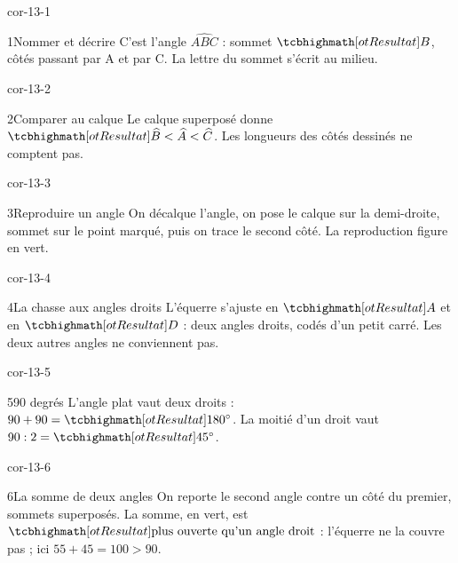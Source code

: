\clearpage\pagestyle{otMain}\setlength{\otBlocEspacement}{2.5mm}\fontsize{11}{15}\selectfont{}
\begin{blocLivre}{cor-13-1}\begin{corrige}{1}{Nommer et décrire}
C’est l’angle $\widehat{ABC}$ : sommet $\res B$, côtés passant par A et par C. La lettre du sommet s’écrit au milieu.
\label{fig-cor-13-1}
\end{corrige}\end{blocLivre}
\begin{blocLivre}{cor-13-2}\begin{corrige}{2}{Comparer au calque}
Le calque superposé donne $\res{\widehat B<\widehat A<\widehat C}$. Les longueurs des côtés dessinés ne comptent pas.
\label{fig-cor-13-2}
\end{corrige}\end{blocLivre}
\begin{blocLivre}{cor-13-3}\begin{corrige}{3}{Reproduire un angle}
On décalque l’angle, on pose le calque sur la demi-droite, sommet sur le point marqué, puis on trace le second côté. La reproduction figure en vert.
\label{fig-cor-13-3}
\end{corrige}\end{blocLivre}
\begin{blocLivre}{cor-13-4}\begin{corrige}{4}{La chasse aux angles droits}
L’équerre s’ajuste en $\res A$ et en $\res D$ : deux angles droits, codés d’un petit carré. Les deux autres angles ne conviennent pas.
\label{fig-cor-13-4}
\end{corrige}\end{blocLivre}
\begin{blocLivre}{cor-13-5}\begin{corrige}{5}{90 degrés}
L’angle plat vaut deux droits : $90+90=\res{180^\circ}$. La moitié d’un droit vaut $90:2=\res{45^\circ}$.
\end{corrige}\end{blocLivre}
\begin{blocLivre}{cor-13-6}\begin{corrige}{6}{La somme de deux angles}
On reporte le second angle contre un côté du premier, sommets superposés. La somme, en vert, est $\res{\text{plus ouverte qu’un angle droit}}$ : l’équerre ne la couvre pas ; ici $55+45=100>90$.
\label{fig-cor-13-6}
\end{corrige}\end{blocLivre}
